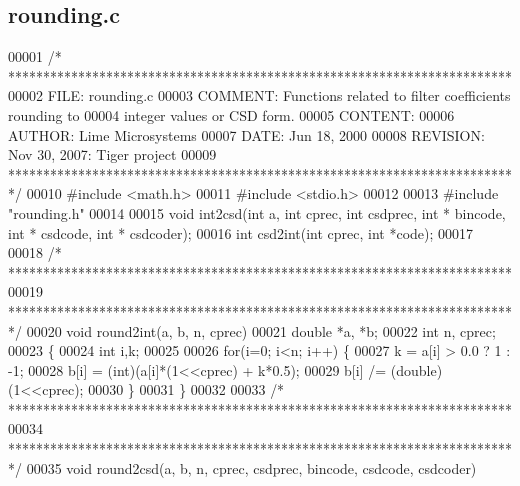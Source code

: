\subsection{rounding.\+c}
\label{rounding_8c_source}

\begin{DoxyCode}
00001 \textcolor{comment}{/* ************************************************************************ }
00002 \textcolor{comment}{   FILE:    rounding.c}
00003 \textcolor{comment}{   COMMENT: Functions related to filter coefficients rounding to}
00004 \textcolor{comment}{        integer values or CSD form.}
00005 \textcolor{comment}{   CONTENT:}
00006 \textcolor{comment}{   AUTHOR:  Lime Microsystems}
00007 \textcolor{comment}{   DATE:    Jun 18, 2000}
00008 \textcolor{comment}{   REVISION:    Nov 30, 2007:   Tiger project}
00009 \textcolor{comment}{   ************************************************************************ */}
00010 \textcolor{preprocessor}{#include <math.h>}
00011 \textcolor{preprocessor}{#include <stdio.h>}
00012 
00013 \textcolor{preprocessor}{#include "rounding.h"}
00014 
00015 \textcolor{keywordtype}{void} int2csd(\textcolor{keywordtype}{int} a, \textcolor{keywordtype}{int} cprec, \textcolor{keywordtype}{int} csdprec, \textcolor{keywordtype}{int} * bincode, \textcolor{keywordtype}{int} * csdcode, \textcolor{keywordtype}{int} * csdcoder); 
00016 \textcolor{keywordtype}{int} csd2int(\textcolor{keywordtype}{int} cprec, \textcolor{keywordtype}{int} *code);
00017 
00018 \textcolor{comment}{/* ************************************************************************ }
00019 \textcolor{comment}{   ************************************************************************ */}
00020 \textcolor{keywordtype}{void} round2int(a, b, n, cprec)
00021 double *a, *b;
00022 \textcolor{keywordtype}{int} n, cprec;
00023 \{
00024     \textcolor{keywordtype}{int} i,k;
00025 
00026     \textcolor{keywordflow}{for}(i=0; i<n; i++) \{
00027         k = a[i] > 0.0 ? 1 : -1;
00028         b[i] = (int)(a[i]*(1<<cprec) + k*0.5);
00029         b[i] /= (double)(1<<cprec);
00030     \}
00031 \}
00032 
00033 \textcolor{comment}{/* ************************************************************************ }
00034 \textcolor{comment}{   ************************************************************************ */}
00035 \textcolor{keywordtype}{void} round2csd(a, b, n, cprec, csdprec, bincode, csdcode, csdcoder)

\end{DoxyCode}
